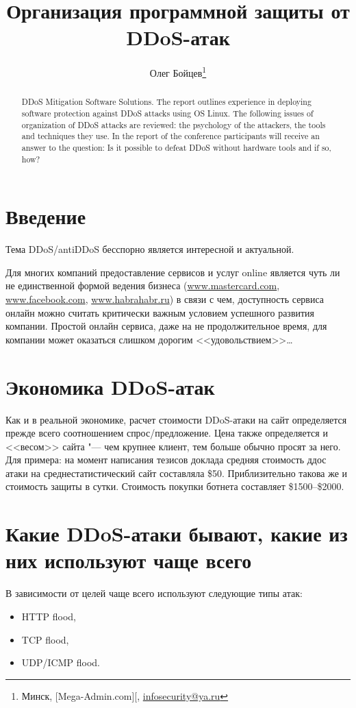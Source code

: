 \documentclass[10pt, a5paper]{article}
\begin{document}
\title{Организация программной защиты от DDoS-атак }

\author{Олег Бойцев\footnote{Минск, [Mega-Admin.com][, \url{infosecurity@ya.ru}}}
\maketitle

\begin{abstract}
DDoS Mitigation Software Solutions. The report outlines experience in deploying software protection against DDoS attacks using OS Linux. The following  issues of organization of DDoS attacks are reviewed: the psychology of the attackers, the tools and techniques they use. In the report of the conference participants will receive an answer to the question: Is it possible to defeat DDoS without hardware tools and if so, how?
\end{abstract}

\section*{Введение}
Тема DDoS/antiDDoS бесспорно является интересной и актуальной. 

Для многих компаний предоставление сервисов и услуг  online является чуть ли не единственной формой ведения бизнеса (\url{www.mastercard.com}, \url{www.facebook.com}, \url{www.habrahabr.ru}) в связи с чем, доступность сервиса онлайн можно считать критически важным условием успешного развития компании. Простой онлайн сервиса, даже на не продолжительное время, для компании может оказаться слишком дорогим <<удовольствием>>\ldots

\section*{Экономика DDoS-атак}
Как и в реальной экономике, расчет стоимости DDoS-атаки на сайт определяется прежде всего соотношением спрос/предложение. Цена также определяется и <<весом>> сайта "--- чем крупнее клиент, тем больше обычно просят за него.
Для примера: на момент написания тезисов доклада средняя стоимость ддос атаки на среднестатистический сайт составляла \$50. Приблизительно такова же и стоимость защиты в сутки. Стоимость покупки ботнета составляет \$1500--\$2000.

\section*{Какие DDoS-атаки бывают, какие из них используют чаще всего}
В зависимости от целей  чаще всего используют следующие типы атак:  
\begin{itemize}
\item HTTP flood,
\item TCP flood,
\item UDP/ICMP flood.
\end{itemize}
\end{document}
